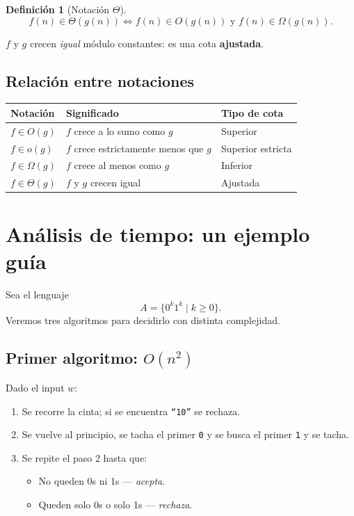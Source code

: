 \documentclass[11pt,a4paper]{article}
\theoremstyle{definicion}
\newtheorem{definicion}{Definici\'on}[section]
\begin{document}
\begin{definicion}[Notaci\'on $\Theta$]
\[
f(n) \in \Theta(g(n)) \iff f(n) \in O(g(n)) \text{ y } f(n) \in \Omega(g(n)).
\]
\end{definicion}

\begin{intuicion}
$f$ y $g$ crecen \emph{igual} m\'odulo constantes: es una cota \textbf{ajustada}.
\end{intuicion}

\subsection{Relaci\'on entre notaciones}

\begin{center}
\begin{tabular}{lll}
\toprule
Notaci\'on & Significado & Tipo de cota \\
\midrule
$f \in O(g)$ & $f$ crece a lo sumo como $g$ & Superior \\
$f \in o(g)$ & $f$ crece estrictamente menos que $g$ & Superior estricta \\
$f \in \Omega(g)$ & $f$ crece al menos como $g$ & Inferior \\
$f \in \Theta(g)$ & $f$ y $g$ crecen igual & Ajustada \\
\bottomrule
\end{tabular}
\end{center}

\section{An\'alisis de tiempo: un ejemplo gu\'ia}

Sea el lenguaje
\[
A = \{ 0^k 1^k \mid k \geq 0 \}.
\]
Veremos tres algoritmos para decidirlo con distinta complejidad.

\subsection{Primer algoritmo: $O(n^2)$}

Dado el input $w$:
\begin{enumerate}
    \item Se recorre la cinta; si se encuentra \texttt{``10''} se rechaza.
    \item Se vuelve al principio, se tacha el primer \texttt{0} y se busca el primer \texttt{1} y se tacha.
    \item Se repite el paso 2 hasta que:
    \begin{itemize}
        \item No queden 0s ni 1s --- \emph{acepta}.
        \item Queden solo 0s o solo 1s --- \emph{rechaza}.
    \end{itemize}
\end{enumerate}
\end{document}
